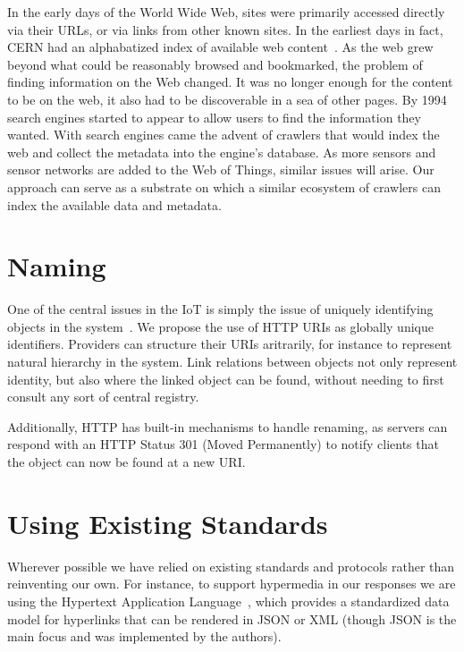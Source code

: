 \documentclass{acm_proc_article-sp}
\begin{document}
In the early days of the World Wide Web, sites were primarily accessed directly
via their URLs, or via links from other known sites. In the earliest days in
fact, CERN had an alphabatized index of available web
content~\cite{websearchengines}. As the web grew beyond what could be
reasonably browsed and bookmarked, the problem of finding information on the
Web changed. It was no longer enough for the content to be on the web, it also
had to be discoverable in a sea of other pages. By 1994 search engines started
to appear to allow users to find the information they wanted. With search
engines came the advent of crawlers that would index the web and collect the
metadata into the engine's database. As more sensors and sensor networks are
added to the Web of Things, similar issues will arise. Our approach can serve
as a substrate on which a similar ecosystem of crawlers can index the available
data and metadata.

\section{Naming}

One of the central issues in the IoT is simply the issue of uniquely
identifying objects in the system~\cite{iotsurvey}. We propose the use of HTTP
URIs as globally unique identifiers. Providers can structure their URIs
aritrarily, for instance to represent natural hierarchy in the system. Link
relations between objects not only represent identity, but also where the
linked object can be found, without needing to first consult any sort of
central registry.

Additionally, HTTP has built-in mechanisms to handle renaming, as servers can
respond with an HTTP Status 301 (Moved Permanently) to notify clients that the
object can now be found at a new URI.

\section{Using Existing Standards}

Wherever possible we have relied on existing standards and protocols rather
than reinventing our own. For instance, to support hypermedia in our responses
we are using the Hypertext Application Language~\cite{json-hal-draft}, which
provides a standardized data model for hyperlinks that can be rendered in JSON
or XML (though JSON is the main focus and was implemented by the authors).
\end{document}
